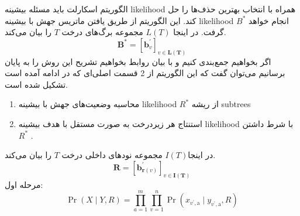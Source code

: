 \newpage
الگوریتم اسکارلت باید مسئله بیشینه \gls{likelihood} همراه با  انتخاب بهترین حذف‌ها را حل کند. این الگوریتم از طریق یافتن ماتریس جهش با بیشینه \gls{likelihood} $B^*$ انجام خواهد گرفت. در اینجا $L(T)$
مجموعه برگ‌های درخت $T$ را بیان می‌کند. 
\begin{equation}
	\boldsymbol{B}^{*}=\left[\boldsymbol{b}_{v}^{\prime}\right]_{v \in \boldsymbol{L}(\boldsymbol{T})}
\end{equation}
اگر بخواهیم جمع‌بندی کنیم و با بیان روابط بخواهیم تشریح این روش را به پایان برسانیم می‌توان گفت که این الگوریتم از 2 قسمت اصلی‌ای که در ادامه آمده است تشکیل شده است. 
\begin{enumerate}
	\item      محاسبه وضعیت‌های جهش با بیشینه \gls{likelihood} $R^*$ از ریشه \gls{subtrees} 
	\item استنتاج هر زیردرخت به صورت مستقل با هدف بیشینه \gls{likelihood} با شرط داشتن $R^*$ .
\end{enumerate}
در اینجا$I(T)$ مجموعه نودهای داخلی درخت $T$ را بیان می‌کند. 
\begin{equation}
\boldsymbol{R}=\left[\boldsymbol{b}_{\boldsymbol{r}(v)}^{\prime}\right]_{v \in \boldsymbol{I}(\boldsymbol{T})}
\end{equation}
مرحله اول:
\begin{equation}
\operatorname{Pr}(X \mid Y, R)=\prod_{a=1}^{m} \prod_{v=1}^{n} \operatorname{Pr}\left(x_{v^{\prime}, \mathrm{a}} \mid y_{v^{\prime}, \mathrm{a}}, R\right)
\end{equation}

